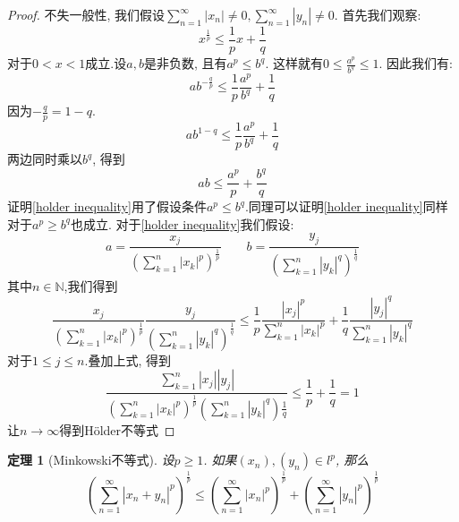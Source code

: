 \documentclass[a4paper,11pt]{book}
\newtheorem{theorem}{\hspace{2em}定理}[section]
\newtheorem{proof}{证明}[section]
\begin{document}
\begin{proof}
  不失一般性, 我们假设$\sum_{n=1}^{\infty}|x_n|\neq0,\sum_{n=1}^{\infty}|y_n|\neq0$. 首先我们观察:
  \begin{equation*}
    x^{\frac{1}{p}}\leq\frac{1}{p}x+\frac{1}{q}
  \end{equation*}
  对于$0<x<1$成立.设$a,b$是非负数, 且有$a^p\leq b^q$. 这样就有$0\leq\frac{a^p}{b^q}\leq1$. 因此我们有:
  \begin{equation*}
    ab^{-\frac{q}{p}}\leq\frac{1}{p}\frac{a^p}{b^q}+\frac{1}{q}
  \end{equation*}
  因为$-\frac{q}{p}=1-q$.
  \begin{equation*}
    ab^{1-q}\leq\frac{1}{p}\frac{a^p}{b^q}+\frac{1}{q}
  \end{equation*}
  两边同时乘以$b^q$, 得到
  \begin{equation}\label{holder inequality}
    ab\leq\frac{a^p}{p}+\frac{b^q}{q}
  \end{equation}
  证明\ref{holder inequality}用了假设条件$a^p\leq b^q$.同理可以证明\ref{holder inequality}同样对于$a^p\geq b^q$也成立. 对于\ref{holder inequality}我们假设:
  \begin{equation*}
    a=\frac{x_j}{(\sum_{k=1}^{n}|x_k|^p)^\frac{1}{p}}\quad\quad  b=\frac{y_j}{(\sum_{k=1}^{n}|y_k|^q)^\frac{1}{q}}
  \end{equation*}
  其中$n\in\mathbb{N}$,我们得到
  \begin{equation*}
    \frac{x_j}{(\sum_{k=1}^{n}|x_k|^p)^{\frac{1}{p}}}\frac{y_j}{(\sum_{k=1}^{n}|y_k|^q)^\frac{1}{q}}\leq\frac{1}{p}\frac{|x_j|^p}{\sum_{k=1}^{n}|x_k|^p}+\frac{1}{q}\frac{|y_j|^q}{\sum_{k=1}^{n}|y_k|^q}
  \end{equation*}
  对于$1\leq j\leq n$.叠加上式, 得到
  \begin{equation*}
    \frac{\sum_{k=1}^{n}|x_j||y_j|}{(\sum_{k=1}^{n}|x_k|^p)^{\frac{1}{p}}(\sum_{k=1}^{n}|y_k|^q)\frac{1}{q}}\leq\frac{1}{p}+\frac{1}{q}=1
  \end{equation*}
  让$n\rightarrow\infty$得到H\"{o}lder不等式
\end{proof}
\begin{theorem}[Minkowski不等式]
  设$p\geq1$. 如果$(x_n),(y_n)\in l^p$, 那么
  \begin{equation*}
    (\sum_{n=1}^{\infty}|x_n+y_n|^p)^{\frac{1}{p}}\leq(\sum_{n=1}^{\infty}|x_n|^p)^\frac{1}{p}+(\sum_{n=1}^{\infty}|y_n|^p)^\frac{1}{p}
  \end{equation*}
\end{theorem}
\end{document}
